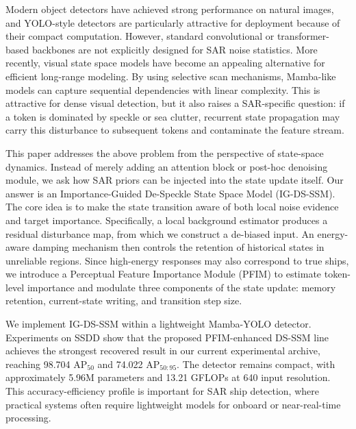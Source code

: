 \documentclass[letterpaper]{article}
\begin{document}
Modern object detectors have achieved strong performance on natural images, and YOLO-style detectors are particularly attractive for deployment because of their compact computation. However, standard convolutional or transformer-based backbones are not explicitly designed for SAR noise statistics. More recently, visual state space models have become an appealing alternative for efficient long-range modeling. By using selective scan mechanisms, Mamba-like models can capture sequential dependencies with linear complexity. This is attractive for dense visual detection, but it also raises a SAR-specific question: if a token is dominated by speckle or sea clutter, recurrent state propagation may carry this disturbance to subsequent tokens and contaminate the feature stream.

This paper addresses the above problem from the perspective of state-space dynamics. Instead of merely adding an attention block or post-hoc denoising module, we ask how SAR priors can be injected into the state update itself. Our answer is an Importance-Guided De-Speckle State Space Model (IG-DS-SSM). The core idea is to make the state transition aware of both local noise evidence and target importance. Specifically, a local background estimator produces a residual disturbance map, from which we construct a de-biased input. An energy-aware damping mechanism then controls the retention of historical states in unreliable regions. Since high-energy responses may also correspond to true ships, we introduce a Perceptual Feature Importance Module (PFIM) to estimate token-level importance and modulate three components of the state update: memory retention, current-state writing, and transition step size.

We implement IG-DS-SSM within a lightweight Mamba-YOLO detector. Experiments on SSDD show that the proposed PFIM-enhanced DS-SSM line achieves the strongest recovered result in our current experimental archive, reaching 98.704 AP$_{50}$ and 74.022 AP$_{50:95}$. The detector remains compact, with approximately 5.96M parameters and 13.21 GFLOPs at 640 input resolution. This accuracy-efficiency profile is important for SAR ship detection, where practical systems often require lightweight models for onboard or near-real-time processing.
\end{document}
